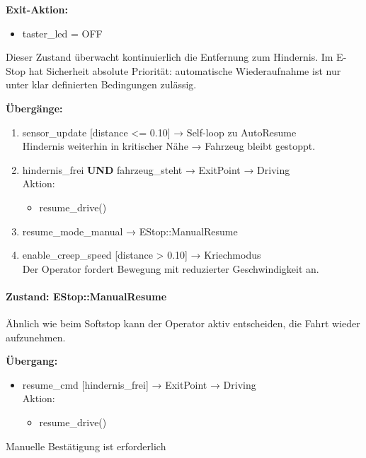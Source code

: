 \textbf{Exit-Aktion:}
\begin{itemize}
    \item taster\_led = OFF
\end{itemize}

Dieser Zustand überwacht kontinuierlich die Entfernung zum Hindernis. Im
E-Stop hat Sicherheit absolute Priorität: automatische Wiederaufnahme ist nur
unter klar definierten Bedingungen zulässig.

\textbf{Übergänge:}
\begin{enumerate}
    \item sensor\_update [distance <= 0.10] → Self-loop zu AutoResume\\
    Hindernis weiterhin in kritischer Nähe → Fahrzeug bleibt gestoppt.

    \item hindernis\_frei \textbf{UND} fahrzeug\_steht → ExitPoint → Driving\\
    Aktion:
    \begin{itemize}
        \item resume\_drive()
    \end{itemize}

    \item resume\_mode\_manual → EStop::ManualResume

    \item enable\_creep\_speed [distance > 0.10] → Kriechmodus\\
    Der Operator fordert Bewegung mit reduzierter Geschwindigkeit an.
\end{enumerate}

\paragraph{Zustand: EStop::ManualResume}

Ähnlich wie beim Softstop kann der Operator aktiv entscheiden, die Fahrt wieder
aufzunehmen.

\textbf{Übergang:}
\begin{itemize}
    \item resume\_cmd [hindernis\_frei] → ExitPoint → Driving\\
    Aktion:
    \begin{itemize}
        \item resume\_drive()
    \end{itemize}
\end{itemize}

Manuelle Bestätigung ist erforderlich
